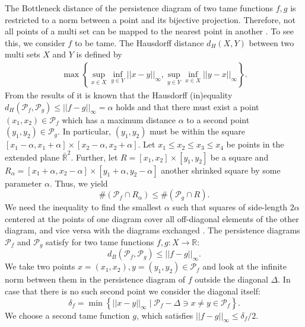 \documentclass[runningheads]{llncs}
\begin{document}
The Bottleneck distance of the persistence diagram of two tame functions $f,g$ is restricted to a norm between a point and its bijective projection. Therefore, not all points of a multi set can be mapped to the nearest point in another \cite{Cohen-SteinerEH07}. To see this, we consider $f$ to be tame. The Hausdorff distance $d_H(X,Y)$ between two multi sets $X$ and $Y$ is defined by
\begin{align}
\max \left\{\sup_{x \in X} \inf_{y \in Y} ||x-y||_\infty, \sup_{y \in Y} \inf_{x \in X} ||y-x||_\infty \right\}.
\end{align}
From the results of \cite{CerriL16} it is known that the Hausdorff (in)equality $d_H(\mathcal{P}_f,\mathcal{P}_g) \leq ||f-g||_\infty = \alpha$ holds and that there must exist a point $(x_1,x_2) \in \mathcal{P}_f$ which has a maximum distance $\alpha$ to a second point $(y_1,y_2) \in \mathcal{P}_g$. In particular, $(y_1,y_2)$ must be within the square $[x_1 -\alpha, x_1 + \alpha] \times [x_2-\alpha, x_2+\alpha]$. Let $x_1 \leq x_2 \leq x_3 \leq x_4$ be points in the extended plane $\bar{\mathbb{R}}^2$. Further, let $R = [x_1,x_2] \times [y_1,y_2]$ be a square and $R_\alpha = [x_1+\alpha,x_2-\alpha] \times [y_1+\alpha,y_2-\alpha]$ another shrinked square by some parameter $\alpha$. Thus, we yield
\begin{equation}
\label{boxlemma}
\#\left( \mathcal{P}_f \cap R_\alpha \right) \leq \#\left(\mathcal{P}_g \cap R \right).
\end{equation}
We need the inequality to find the smallest $\alpha$ such that squares of side-length $2 \alpha$ centered at the points of one diagram cover all off-diagonal elements of the other diagram, and vice versa with the diagrams exchanged \cite{Cohen-SteinerEH07}. The persistence diagrams $\mathcal{P}_f$ and $\mathcal{P}_g$ satisfy for two tame functions $f,g: X \rightarrow \mathbb{R}$:
\begin{equation}
d_B\left(\mathcal{P}_f,\mathcal{P}_g\right) \leq ||f-g||_\infty.
\end{equation}
We take two points $x = (x_1,x_2), y=(y_1,y_2) \in \mathcal{P}_f$ and look at the infinite norm between them in the persistence diagram of $f$ outside the diagonal $\Delta$. In case that there is no such second point we consider the diagonal itself:
\begin{equation}
\delta_f = \min\left\{ ||x-y||_\infty \; \vert \; \mathcal{P}_f-\Delta \ni x \neq y \in \mathcal{P}_f \right\}.
\end{equation}
We choose a second tame function $g$, which satisfies $||f-g||_\infty \leq \delta_f/2$.
\end{document}
